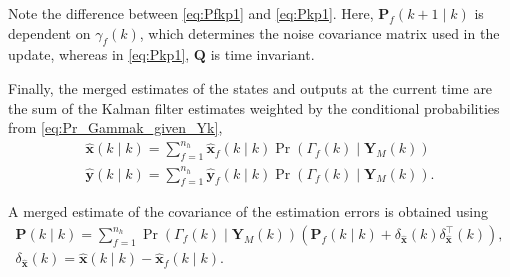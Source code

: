 {{Note the difference between \eqref{eq:Pfkp1} and \eqref{eq:Pkp1}.  Here, $\mathbf{P}_f(k+1 \mid k)$ is dependent on $\gamma_f(k)$, which determines the noise covariance matrix used in the update, whereas in \eqref{eq:Pkp1}, $\mathbf{Q}$ is time invariant.

Finally, the merged estimates of the states and outputs at the current time are the sum of the Kalman filter estimates weighted by the conditional probabilities from \eqref{eq:Pr_Gammak_given_Yk},
\begin{equation} \label{eq:xkyk_hat_MKF}
	\begin{aligned}
		\mathbf{\hat{x}}(k \mid k) = \sum_{f=1}^{n_h} \mathbf{\hat{x}}_f(k \mid k) \Pr(\Gamma_f(k) \mid \mathbf{Y}_M(k)) \\
		\mathbf{\hat{y}}(k \mid k) = \sum_{f=1}^{n_h} \mathbf{\hat{y}}_f(k \mid k) \Pr(\Gamma_f(k) \mid \mathbf{Y}_M(k)).
	\end{aligned}
\end{equation}

A merged estimate of the covariance of the estimation errors is obtained using
\begin{equation} \label{eq:Pk_MKF}
	\begin{aligned}
	\mathbf{P}(k \mid k) = \sum_{f=1}^{n_h} \Pr(\Gamma_f(k) \mid \mathbf{Y}_M(k)) \left( \mathbf{P}_f(k \mid k) + \delta_\mathbf{\hat{x}}(k) \delta_\mathbf{\hat{x}}^\intercal(k) \right), \\
	\delta_\mathbf{\hat{x}}(k) = \mathbf{\hat{x}}(k \mid k) - \mathbf{\hat{x}}_f(k \mid k).
	\end{aligned}
\end{equation}

}}
